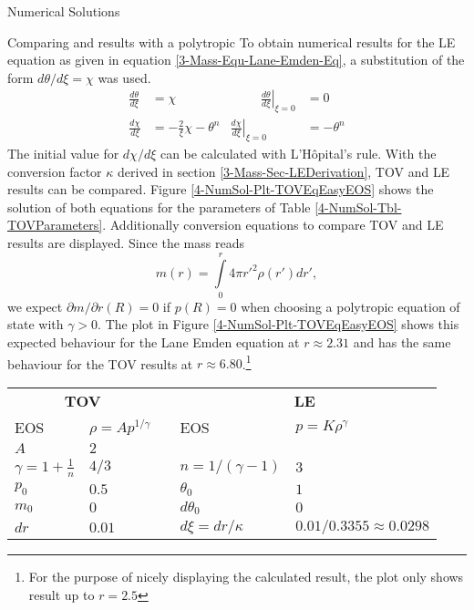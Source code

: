 \begin{section}{Numerical Solutions}
\begin{subsection}{Comparing  and  results with a polytropic }
To obtain numerical results for the \ac{LE} equation as given in equation \eqref{3-Mass-Equ-Lane-Emden-Eq}, a substitution of the form $d\theta/d\xi=\chi$ was used.
\begin{equation}
	\begin{aligned}
		\frac{d\theta}{d\xi} &= \chi &\hspace{1cm} \left.\frac{d\theta}{d\xi}\right|_{\xi=0} &= 0\\
		\frac{d\chi}{d\xi} &= -\frac{2}{\xi}\chi-\theta^n & \left.\frac{d\chi}{d\xi}\right|_{\xi=0} &= -\theta^n
		\label{4-NumSol-Equ-LE-Substitution}
	\end{aligned}
\end{equation}
The initial value for $d\chi/d\xi$ can be calculated with L'Hôpital's rule.
With the conversion factor $\kappa$ derived in section \ref{3-Mass-Sec-LEDerivation}, \ac{TOV} and \ac{LE} results can be compared.
Figure \ref{4-NumSol-Plt-TOVEqEasyEOS} shows the solution of both equations for the parameters of Table \ref{4-NumSol-Tbl-TOVParameters}.
Additionally conversion equations to compare \ac{TOV} and \ac{LE} results are displayed.
Since the mass reads
\begin{equation}
	m(r) = \int\limits_0^r 4\pi r'^2\rho(r')dr',
\end{equation}
we expect $\partial m/\partial r(R)=0$ if $p(R)=0$ when choosing a polytropic equation of state with $\gamma>0$.
The plot in Figure \ref{4-NumSol-Plt-TOVEqEasyEOS} shows this expected behaviour for the Lane Emden equation at $r\approx2.31$ and has the same behaviour for the \ac{TOV} results at $r\approx6.80$.\footnote{For the purpose of nicely displaying the calculated result, the plot only shows result up to $r=2.5$}
\begin{table}[H]
	{\renewcommand{\arraystretch}{1.2}
	\centering
	\begin{tabular}{@{}llcll@{}}
		\toprule
		\multicolumn{2}{c}{\textbf{TOV}} & \phantom{abc} &\multicolumn{2}{c}{\textbf{LE}}\\
		\cmidrule{1-2} \cmidrule{4-5}
		EOS & $\rho=Ap^{1/\gamma}$ && EOS & $p=K\rho^{\gamma}$\\
		$A$ & $2$ & & \\
		$\gamma=1+\frac{1}{n}$ & $4/3$ && $n=1/(\gamma-1)$ & $3$\\
		$p_0$ & $0.5$ && $\theta_0$ & $1$\\
		$m_0$ & $0$ && $d\theta_0$ & $0$\\
		$dr$ & $0.01$ && $d\xi=dr/\kappa$ & $0.01/0.3355\approx0.0298$\\

\end{tabular}}
\end{table}
\end{subsection}
\end{section}
